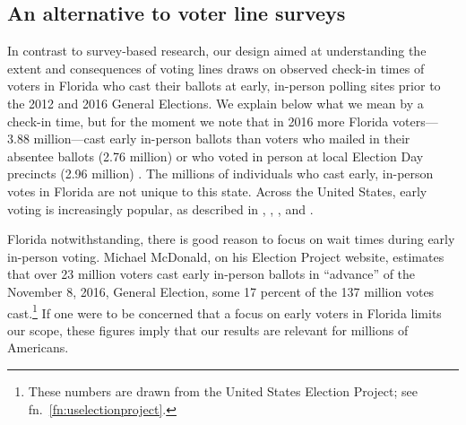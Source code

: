 \documentclass[12pt,titlepage]{article}
\begin{document}

\subsection*{An alternative to voter line surveys}

In contrast to survey-based research, our design aimed at
understanding the extent and consequences of voting lines draws on
\mbox{observed} check-in times of voters in Florida who cast their
ballots at early, in-person polling sites prior to the 2012 and 2016
General Elections. We explain below what we mean by a check-in time,
but for the moment we note that in 2016 more Florida voters---3.88
million---cast early in-person ballots than voters who mailed in their
absentee ballots (2.76 million) or who voted in person at local
Election Day precincts (2.96 million) \citep{FDOS:2016vote}. The
millions of individuals who cast early, in-person votes in Florida are
not unique to this state. Across the United States, early voting is
increasingly popular, as described in
\citet{neelyrichardson:earlyvoting}, \citet{gronkebaum:growth},
\citet{gronketoffey:psychological}, and
\citet{burdenetal:unanticipated}.




Florida notwithstanding, there is good reason to focus on wait times
during early in-person voting. Michael McDonald, on his Election
Project website, estimates that over 23 million voters cast early
in-person ballots in ``advance'' of the November 8, 2016, General
Election, some 17 percent of the 137 million votes
cast.\footnote{These numbers are drawn from the United States Election
  Project; see fn.\ \ref{fn:uselectionproject}.} If one were to be
concerned that a focus on early voters in Florida limits our scope,
these figures imply that our results are relevant for millions of
Americans.

\end{document}
